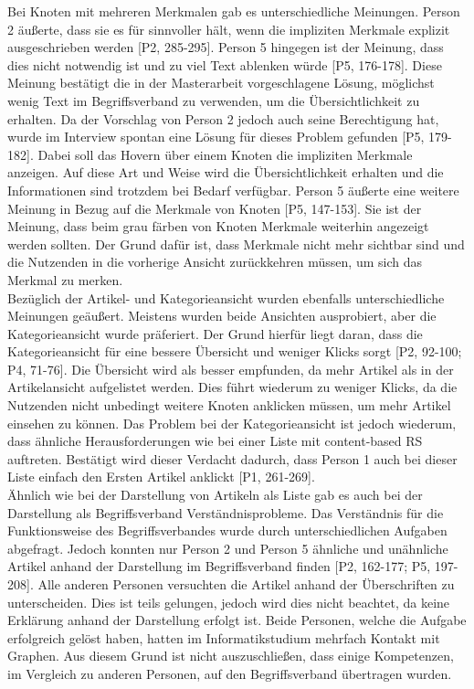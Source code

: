 Bei Knoten mit mehreren Merkmalen gab es unterschiedliche Meinungen.
Person 2 äußerte, dass sie es für sinnvoller hält, wenn die impliziten Merkmale explizit ausgeschrieben werden [P2, 285-295].
Person 5 hingegen ist der Meinung, dass dies nicht notwendig ist und zu viel Text ablenken würde [P5, 176-178].
Diese Meinung bestätigt die in der Masterarbeit vorgeschlagene Lösung, möglichst wenig Text im Begriffsverband zu verwenden, um die Übersichtlichkeit zu erhalten.
Da der Vorschlag von Person 2 jedoch auch seine Berechtigung hat, wurde im Interview spontan eine Lösung für dieses Problem gefunden [P5, 179-182].
Dabei soll das Hovern über einem Knoten die impliziten Merkmale anzeigen.
Auf diese Art und Weise wird die Übersichtlichkeit erhalten und die Informationen sind trotzdem bei Bedarf verfügbar.
Person 5 äußerte eine weitere Meinung in Bezug auf die Merkmale von Knoten [P5, 147-153].
Sie ist der Meinung, dass beim grau färben von Knoten Merkmale weiterhin angezeigt werden sollten.
Der Grund dafür ist, dass Merkmale nicht mehr sichtbar sind und die Nutzenden in die vorherige Ansicht zurückkehren müssen, um sich das Merkmal zu merken.\\

Bezüglich der Artikel- und Kategorieansicht wurden ebenfalls unterschiedliche Meinungen geäußert.
Meistens wurden beide Ansichten ausprobiert, aber die Kategorieansicht wurde präferiert.
Der Grund hierfür liegt daran, dass die Kategorieansicht für eine bessere Übersicht und weniger Klicks sorgt [P2, 92-100; P4, 71-76].
Die Übersicht wird als besser empfunden, da mehr Artikel als in der Artikelansicht aufgelistet werden.
Dies führt wiederum zu weniger Klicks, da die Nutzenden nicht unbedingt weitere Knoten anklicken müssen, um mehr Artikel einsehen zu können.
Das Problem bei der Kategorieansicht ist jedoch wiederum, dass ähnliche Herausforderungen wie bei einer Liste mit content-based \ac{RS} auftreten.
Bestätigt wird dieser Verdacht dadurch, dass Person 1 auch bei dieser Liste \glqq einfach den Ersten\grqq{} Artikel anklickt [P1, 261-269].\\

Ähnlich wie bei der Darstellung von Artikeln als Liste gab es auch bei der Darstellung als Begriffsverband Verständnisprobleme.
Das Verständnis für die Funktionsweise des Begriffsverbandes wurde durch unterschiedlichen Aufgaben abgefragt.
Jedoch konnten nur Person 2 und Person 5 ähnliche und unähnliche Artikel anhand der Darstellung im Begriffsverband finden [P2, 162-177; P5, 197-208].
Alle anderen Personen versuchten die Artikel anhand der Überschriften zu unterscheiden.
Dies ist teils gelungen, jedoch wird dies nicht beachtet, da keine Erklärung anhand der Darstellung erfolgt ist.
Beide Personen, welche die Aufgabe erfolgreich gelöst haben, hatten im Informatikstudium mehrfach Kontakt mit Graphen.
Aus diesem Grund ist nicht auszuschließen, dass einige Kompetenzen, im Vergleich zu anderen Personen, auf den Begriffsverband übertragen wurden. \\

